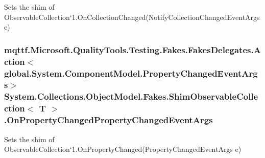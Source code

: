 Sets the shim of Observable\-Collection`1.On\-Collection\-Changed(\-Notify\-Collection\-Changed\-Event\-Args e)

\hypertarget{class_system_1_1_collections_1_1_object_model_1_1_fakes_1_1_shim_observable_collection_3_01_t_01_4_a1fd56d1b2dedff5152ca0a12dab14652}{
\subsubsection[{On\-Property\-Changed\-Property\-Changed\-Event\-Args}]{\setlength{\rightskip}{0pt plus 5cm}mqttf.\-Microsoft.\-Quality\-Tools.\-Testing.\-Fakes.\-Fakes\-Delegates.\-Action$<$global.\-System.\-Component\-Model.\-Property\-Changed\-Event\-Args$>$ System.\-Collections.\-Object\-Model.\-Fakes.\-Shim\-Observable\-Collection$<$ T $>$.On\-Property\-Changed\-Property\-Changed\-Event\-Args\hspace{0.3cm}{\ttfamily [set]}}}\label{class_system_1_1_collections_1_1_object_model_1_1_fakes_1_1_shim_observable_collection_3_01_t_01_4_a1fd56d1b2dedff5152ca0a12dab14652}


Sets the shim of Observable\-Collection`1.On\-Property\-Changed(\-Property\-Changed\-Event\-Args e)

